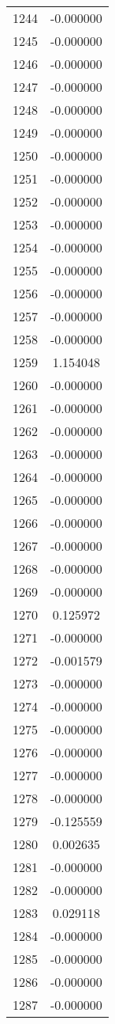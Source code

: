 \documentclass[12pt]{article}
\begin{document}
\begin{longtable}{@{}cc@{}}
1244 & -0.000000 \\
1245 & -0.000000 \\
1246 & -0.000000 \\
1247 & -0.000000 \\
1248 & -0.000000 \\
1249 & -0.000000 \\
1250 & -0.000000 \\
1251 & -0.000000 \\
1252 & -0.000000 \\
1253 & -0.000000 \\
1254 & -0.000000 \\
1255 & -0.000000 \\
1256 & -0.000000 \\
1257 & -0.000000 \\
1258 & -0.000000 \\
1259 & 1.154048 \\
1260 & -0.000000 \\
1261 & -0.000000 \\
1262 & -0.000000 \\
1263 & -0.000000 \\
1264 & -0.000000 \\
1265 & -0.000000 \\
1266 & -0.000000 \\
1267 & -0.000000 \\
1268 & -0.000000 \\
1269 & -0.000000 \\
1270 & 0.125972 \\
1271 & -0.000000 \\
1272 & -0.001579 \\
1273 & -0.000000 \\
1274 & -0.000000 \\
1275 & -0.000000 \\
1276 & -0.000000 \\
1277 & -0.000000 \\
1278 & -0.000000 \\
1279 & -0.125559 \\
1280 & 0.002635 \\
1281 & -0.000000 \\
1282 & -0.000000 \\
1283 & 0.029118 \\
1284 & -0.000000 \\
1285 & -0.000000 \\
1286 & -0.000000 \\
1287 & -0.000000 \\

\end{longtable}
\end{document}
